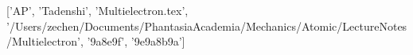 ['AP', 'Tadenshi', 'Multielectron.tex', '/Users/zechen/Documents/PhantasiaAcademia/Mechanics/Atomic/LectureNotes/Multielectron', '\x9a\xad{}\x8e\x9f\xad{}', '\x9e\xbf{}\x9a\x8b\xae\x9a']
